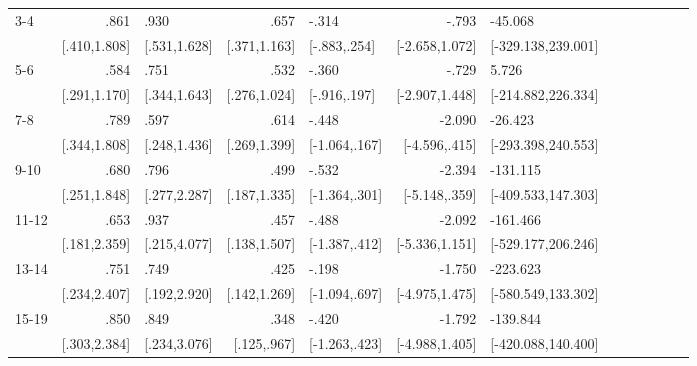 \begin{table}[hp]
\begin{adjustbox}{max width=\linewidth}
\begin{threeparttable}
{\begin{tabular}{l*{6}{D{.}{.}{-1}l}}
3-4             &            .861&            .930&            .657&           -.314&           -.793&         -45.068\\
                &    [.410,1.808]&    [.531,1.628]&    [.371,1.163]&    [-.883,.254]&  [-2.658,1.072]&[-329.138,239.001]\\

5-6             &            .584&            .751&            .532&           -.360&           -.729&           5.726\\
                &    [.291,1.170]&    [.344,1.643]&    [.276,1.024]&    [-.916,.197]&  [-2.907,1.448]&[-214.882,226.334]\\

7-8             &            .789&            .597&            .614&           -.448&          -2.090&         -26.423\\
                &    [.344,1.808]&    [.248,1.436]&    [.269,1.399]&   [-1.064,.167]&   [-4.596,.415]&[-293.398,240.553]\\

9-10            &            .680&            .796&            .499&           -.532&          -2.394&        -131.115\\
                &    [.251,1.848]&    [.277,2.287]&    [.187,1.335]&   [-1.364,.301]&   [-5.148,.359]&[-409.533,147.303]\\

11-12           &            .653&            .937&            .457&           -.488&          -2.092&        -161.466\\
                &    [.181,2.359]&    [.215,4.077]&    [.138,1.507]&   [-1.387,.412]&  [-5.336,1.151]&[-529.177,206.246]\\

13-14           &            .751&            .749&            .425&           -.198&          -1.750&        -223.623\\
                &    [.234,2.407]&    [.192,2.920]&    [.142,1.269]&   [-1.094,.697]&  [-4.975,1.475]&[-580.549,133.302]\\

15-19           &            .850&            .849&            .348&           -.420&          -1.792&        -139.844\\
                &    [.303,2.384]&    [.234,3.076]&     [.125,.967]&   [-1.263,.423]&  [-4.988,1.405]&[-420.088,140.400]\\


\end{tabular}}
\end{threeparttable}
\end{adjustbox}
\end{table}
